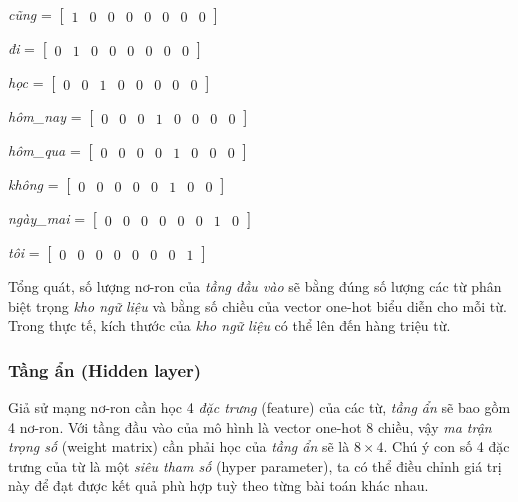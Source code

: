 \textit{cũng} = $\begin{bmatrix}
        1 & 0 & 0 & 0 & 0 & 0 & 0 & 0
    \end{bmatrix}$

\textit{đi} = $\begin{bmatrix}
        0 & 1 &0 & 0 & 0 & 0 & 0 & 0
    \end{bmatrix}$

\textit{học} = $\begin{bmatrix}
        0 & 0 & 1 & 0 & 0 & 0 & 0 & 0
    \end{bmatrix}$

\textit{hôm\_nay} = $\begin{bmatrix}
        0 & 0 & 0 & 1 & 0 & 0 & 0 & 0
    \end{bmatrix}$

\textit{hôm\_qua} = $\begin{bmatrix}
        0 & 0 & 0 & 0 & 1 & 0 & 0 & 0
    \end{bmatrix}$

\textit{không} = $\begin{bmatrix}
        0 & 0 & 0 & 0 & 0 & 1 & 0 & 0
    \end{bmatrix}$

\textit{ngày\_mai} = $\begin{bmatrix}
        0 & 0 & 0 & 0 & 0 & 0 & 1 & 0
    \end{bmatrix}$

\textit{tôi} = $\begin{bmatrix}
        0 & 0 & 0 & 0 & 0 & 0 & 0 & 1
    \end{bmatrix}$

Tổng quát, số lượng nơ-ron của \textit{tầng đầu vào} sẽ bằng đúng số lượng các từ phân biệt trọng \textit{kho ngữ liệu} và bằng số chiều của vector one-hot biểu diễn cho mỗi từ. Trong thực tế, kích thước của \textit{kho ngữ liệu} có thể lên đến hàng triệu từ.

\subsubsection{Tầng ẩn (Hidden layer)}
Giả sử mạng nơ-ron cần học 4 \textit{đặc trưng} (feature) của các từ, \textit{tầng ẩn} sẽ bao gồm 4 nơ-ron. Với tầng đầu vào của mô hình là vector one-hot 8 chiều, vậy \textit{ma trận trọng số} (weight matrix) cần phải học của \textit{tầng ẩn} sẽ là $8\times 4$. Chú ý con số 4 đặc trưng của từ là một \textit{siêu tham số} (hyper parameter), ta có thể điều chỉnh giá trị này để đạt được kết quả phù hợp tuỳ theo từng bài toán khác nhau.\\


